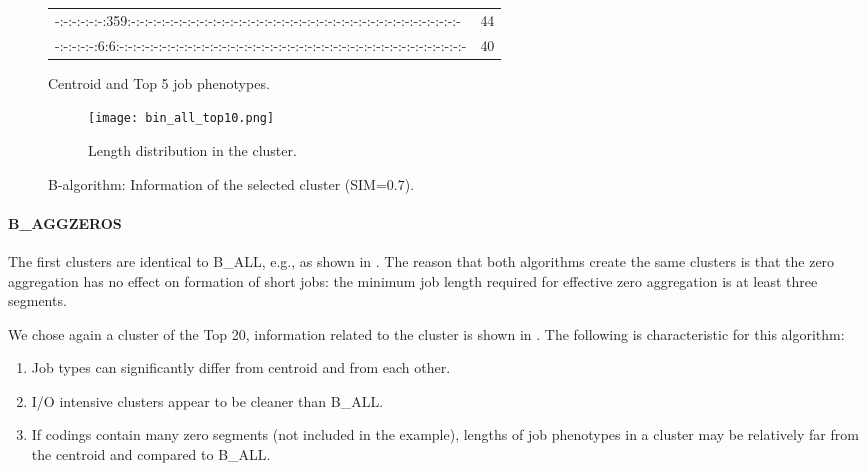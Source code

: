 \documentclass{jhps}
\begin{document}
\begin{figure}
\begin{subtable}{\textwidth}
\begin{tiny}
\begin{tabular}{l|r}
       -:-:-:-:-:-:359:-:-:-:-:-:-:-:-:-:-:-:-:-:-:-:-:-:-:-:-:-:-:-:-:-:-:-:-:-:-:-:-:-:-:-:-:-:-:-    &  44       \\
       -:-:-:-:-:6:6:-:-:-:-:-:-:-:-:-:-:-:-:-:-:-:-:-:-:-:-:-:-:-:-:-:-:-:-:-:-:-:-:-:-:-:-:-:-:-:-:-  &  40       \\
      \end{tabular}
		\end{tiny}
		\caption{Centroid and Top 5 job phenotypes.}
		\label{cluster:bin_all:top_jobs}
	\end{subtable}
	\medskip
	\begin{subfigure}{\textwidth}
		\centering
		\texttt{[image: bin\_all\_top10.png]}
		\caption{Length distribution in the cluster.}
		\label{cluster:bin_all:length}
	\end{subfigure}
	\caption{B-algorithm: Information of the selected cluster (SIM=0.7).}
	\label{cluster:bin_all}
\end{figure}

\FloatBarrier
\paragraph{B\_AGGZEROS}
The first clusters are identical to B\_ALL, e.g., as shown in .
The reason that both algorithms create the same clusters is that the zero aggregation has no effect on formation of short jobs: the minimum job length required for effective zero aggregation is at least three segments.

We chose again a cluster of the Top 20, information related to the cluster is shown in .
The following is characteristic for this algorithm:

\begin{enumerate}
 \item Job types can significantly differ from centroid and from each other.
 \item I/O intensive clusters appear to be cleaner than B\_ALL.
 \item If codings contain many zero segments (not included in the example), lengths of job phenotypes in a cluster may be relatively far from the centroid and compared to B\_ALL.
\end{enumerate}
\end{document}

